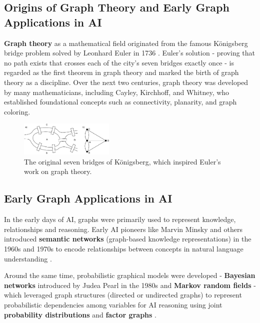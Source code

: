 \documentclass{article}
\begin{document}
\subsection{Origins of Graph Theory and Early Graph Applications in AI}

\textbf{Graph theory} as a mathematical field originated from the famous Königsberg bridge problem solved by Leonhard Euler in 1736 \cite{carlson2019konigsberg}.
Euler's solution - proving that no path exists that crosses each of the city's seven bridges exactly once - is regarded as the first theorem in graph theory and marked the birth of graph theory as a discipline.
Over the next two centuries, graph theory was developed by many mathematicians, including Cayley, Kirchhoff, and Whitney, who established foundational concepts such as connectivity, planarity, and graph coloring.

\begin{figure}[ht]
      \centering
      \includegraphics[width=0.4\textwidth]{../assets/konigsberg-bridges.png}
      \caption{The original seven bridges of Königsberg, which inspired Euler's work on graph theory.}
      \label{fig:konigsberg-bridges}
\end{figure}

\subsection{Early Graph Applications in AI}

In the early days of AI, graphs were primarily used to represent knowledge, relationships and reasoning.
Early AI pioneers like Marvin Minsky and others introduced \textbf{semantic networks} (graph-based knowledge representations) in the 1960s and 1970s to encode relationships between concepts in natural language understanding \cite{kelemen2007neural}.

Around the same time, probabilistic graphical models were developed - \textbf{Bayesian networks} introduced by Judea Pearl in the 1980s \cite{pearl1995bayesian} and \textbf{Markov random fields} \cite{lang2024abstract} - which leveraged graph structures (directed or undirected graphs) to represent probabilistic dependencies among variables for AI reasoning using joint \textbf{probability distributions} and \textbf{factor graphs} \cite{loeliger2004factor}.
\end{document}
